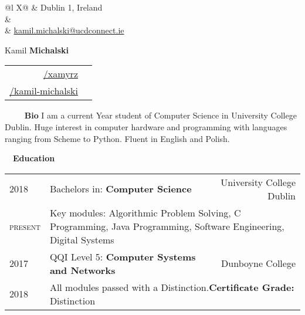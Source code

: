 \documentclass[a4paper, 11pt]{article}
\newcommand{\sectitle}[2]{\large{#1} \ \ \Large{\textbf{#2}}}
\begin{document}
	\pagestyle{fancy}

	\begin{center}
	\begin{multicols}{3}
		\begin{tabularx}{\linewidth}{@{}l X@{}}
			\faMapMarker & Dublin 1, Ireland \\
			\IfFileExists{confidential.tex}{\faPhone & \href{tel:\phoneNumber}{\prettyPhoneNumber} \\}{}
			\faEnvelope	 & \href{mailto:kamil.michalski@ucdconnect.ie}{kamil.michalski@ucdconnect.ie} \\
		\end{tabularx} \vfill \null

		\columnbreak
			{ \Huge{Kamil \textbf{Michalski}}}
		\columnbreak

		\begin{tabularx}{\linewidth}{R | r}
				\href{https://github.com/xamyrz}{/xamyrz} & \faGithub \\
				\href{https://www.linkedin.com/in/kamil-michalski-7069451ab/}{/kamil-michalski} & \faLinkedin \\
		\end{tabularx} \vfill \null
	\end{multicols}
	\end{center}


	\begin{section}{\sectitle{\ \faUser}{\ Bio}}
		I am a current  Year student of Computer Science in University College Dublin. Huge interest in computer hardware and programming with languages ranging from Scheme to Python. Fluent in English and Polish. \\
	\end{section}
	\vspace{-3.5mm}

	\newcommand{\education}[6]{
		\textsc{#1} & #3: \textbf{#4} & \small{#5} \\[-0.5ex]
		\textsc{#2} & \multicolumn{2}{l}{\footnotesize #6}\\
	}



	\begin{section}{\sectitle{\faGraduationCap}{Education}}
		\begin{tabularx}{\linewidth}{@{}p{1.4cm} | X  r}
			\education{2018}{present}{Bachelors in}{Computer Science}{University College Dublin}{Key modules: Algorithmic Problem Solving, C Programming, Java Programming, Software Engineering, Digital Systems}
			\education{2017}{2018}{QQI Level 5}{Computer Systems and Networks}{Dunboyne College}{All modules passed with a Distinction.\hspace{50ex}\textbf{Certificate Grade:} Distinction}
		\end{tabularx}
		\\ \\
	\end{section}
	\vspace{-3.5mm}
\end{document}
